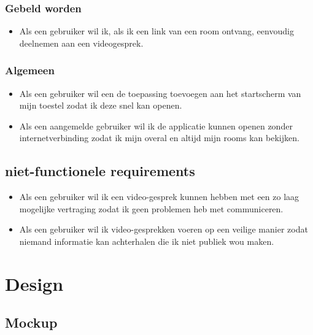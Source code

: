 	 	\subsubsection{Gebeld worden}
	 	 \begin{itemize}
				\item Als een gebruiker wil ik, als ik een link van een room ontvang, eenvoudig deelnemen aan een videogesprek.
	 	 \end{itemize}
	
		\subsubsection{Algemeen}
	 		\begin{itemize}
	 			\item Als een gebruiker wil een de toepassing toevoegen aan het startscherm van mijn toestel zodat ik deze snel kan openen.
	 			\item Als een aangemelde gebruiker wil ik de applicatie kunnen openen zonder internetverbinding zodat ik mijn overal en altijd mijn rooms kan bekijken.
			\end{itemize}
	 
	\subsection{niet-functionele requirements}
		\begin{itemize}
			\item Als een gebruiker wil ik een video-gesprek kunnen hebben met een zo laag mogelijke vertraging zodat ik geen problemen heb met communiceren.
			\item Als een gebruiker wil ik video-gesprekken voeren op een veilige manier zodat niemand informatie kan achterhalen die ik niet publiek wou maken.
		\end{itemize} 
		


\section{Design}
		\subsection{Mockup}
					
